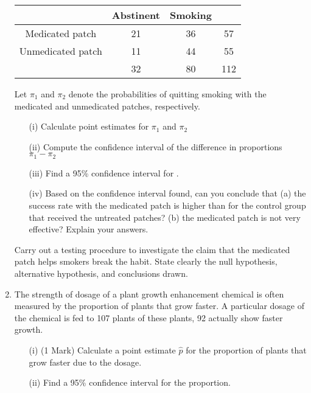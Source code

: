 \documentclass[a4paper,12pt]{article}
\begin{document}
\begin{enumerate}
 \begin{center}
 \begin{tabular}{|c|c|c|c|}
 \hline
 	&     Abstinent  &        Smoking   &     \\ \hline
 	
 	Medicated patch    &      21         &            36   &            57\\ \hline 
 	
 	Unmedicated patch  &       11       &              44   &            55\\ \hline 
 	
 	&       32       &              80    &          112\\ \hline
 \end{tabular} 
 \end{center}
 
 Let $\pi_1$ and $\pi_2$ denote the probabilities of quitting smoking with the medicated and unmedicated patches, respectively.
 
 \begin{itemize}
 	\item[(i)] Calculate point estimates for $\pi_1$ and $\pi_2$ 
 	
 	\item[(ii)] Compute the confidence interval of the difference in proportions $\pi_1 - \pi_2$ 
 	
 	\item[(iii)]Find a 95\% confidence interval for  .
 	\item[(iv)]  Based on the confidence interval found, can you conclude that (a) the success rate with the medicated patch is higher than for the control group that received the untreated patches?  (b) the medicated patch is not very effective?  Explain your answers.
 \end{itemize}

 
 Carry out a testing procedure to investigate the claim that the medicated patch helps smokers break the habit.  State clearly the null hypothesis, alternative hypothesis, and conclusions drawn.




\medskip
\item The strength of dosage of a plant growth enhancement chemical is often measured by the proportion of plants that grow faster. A particular dosage of the chemical is fed to 107 plants of these plants, 92 actually show faster growth.

\begin{itemize}
	\item[(i)] (1 Mark) Calculate a point estimate $\hat{p}$ for the proportion of plants that grow faster due to the dosage. 									 
		
	\item[(ii)]  Find a 95\% confidence interval for the proportion. 					
\end{itemize}



\end{enumerate}
\end{document}

